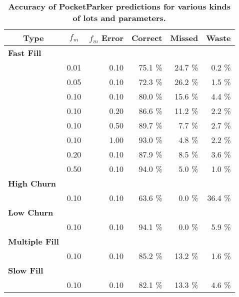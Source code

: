 \begin{table}[t]
\begin{threeparttable}
{\small
\begin{tabularx}{\columnwidth}{Xrrrrr}
\multicolumn{1}{c}{\textbf{Type}} & 
\multicolumn{1}{c}{\textbf{$f_m$}} & 
\multicolumn{1}{c}{\textbf{$f_m$ Error}} & 
\multicolumn{1}{c}{\textbf{Correct}} & 
\multicolumn{1}{c}{\textbf{Missed}} & 
\multicolumn{1}{c}{\textbf{Waste}}\\ \toprule

\textbf{Fast Fill} & & & & & \\
\midrule
& 0.01 & 0.10 & 75.1 \% & 24.7 \% & 0.2 \% \\
& 0.05 & 0.10 & 72.3 \% & 26.2 \% & 1.5 \% \\
& 0.10 & 0.10 & 80.0 \% & 15.6 \% & 4.4 \% \\
& 0.10 & 0.20 & 86.6 \% & 11.2 \% & 2.2 \% \\
& 0.10 & 0.50 & 89.7 \% & 7.7 \% & 2.7 \% \\
& 0.10 & 1.00 & 93.0 \% & 4.8 \% & 2.2 \% \\
& 0.20 & 0.10 & 87.9 \% & 8.5 \% & 3.6 \% \\
& 0.50 & 0.10 & 94.0 \% & 5.0 \% & 1.0 \% \\
\textbf{High Churn} & & & & & \\
\midrule
& 0.10 & 0.10 & 63.6 \% & 0.0 \% & 36.4 \% \\
\textbf{Low Churn} & & & & & \\
\midrule
& 0.10 & 0.10 & 94.1 \% & 0.0 \% & 5.9 \% \\
\textbf{Multiple Fill} & & & & & \\
\midrule
& 0.10 & 0.10 & 85.2 \% & 13.2 \% & 1.6 \% \\
\textbf{Slow Fill} & & & & & \\
\midrule
& 0.10 & 0.10 & 82.1 \% & 13.3 \% & 4.6 \% \\
\end{tabularx}
}
\caption{\textbf{Accuracy of PocketParker predictions for various kinds of lots and parameters.}}
\label{table-capacity}
\end{threeparttable}
\end{table}
